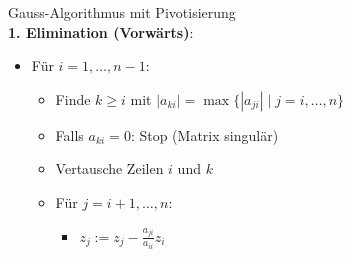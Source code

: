 \begin{KR}{Gauss-Algorithmus mit Pivotisierung}\\
\textbf{1. Elimination (Vorwärts)}:
\begin{itemize}
    \item Für $i=1,\ldots,n-1$:
    \begin{itemize}
    \item Finde $k \geq i$ mit $|a_{ki}| = \max\{|a_{ji}| \mid j = i,\ldots,n\}$
    \item Falls $a_{ki} = 0$: Stop (Matrix singulär)
    \item Vertausche Zeilen $i$ und $k$
    \item Für $j=i+1,\ldots,n$:
    \begin{itemize}
    \item $z_j := z_j - \frac{a_{ji}}{a_{ii}}z_i$
    \end{itemize}
    \end{itemize}
\end{itemize}
\vspace{-2mm}
\end{KR}


